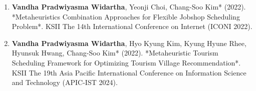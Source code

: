 \begin{enumerate}



    \item \textbf{Vandha Pradwiyasma Widartha}, Yeonji Choi, Chang-Soo Kim* (2022). *Metaheuristics Combination Approaches for Flexible Jobshop Scheduling Problem*. KSII The 14th International Conference on Internet (ICONI 2022).

    \item \textbf{Vandha Pradwiyasma Widartha}, Hyo Kyung Kim, Kyung Hyune Rhee, Hyunsuk Hwang, Chang-Soo Kim* (2022). *Metaheuristic Tourism Scheduling Framework for Optimizing Tourism Village Recommendation*. KSII The 19th Asia Pacific International Conference on Information Science and Technology (APIC-IST 2024).

\end{enumerate}


